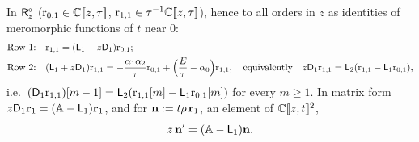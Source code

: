 \begin{prop}
\label{prop:lea-row2}
In $\mathsf{R}_{z}^{\circ}$ ($\mathrm{r}_{0,1}\in\mathbb{C}[\![ z,\tau ]\!]$, $\mathrm{r}_{1,1}\in\tau^{-1}\mathbb{C}[\![ z,\tau ]\!]$), hence to all orders in $z$ as identities of meromorphic functions of $t$ near $0$:
\begin{align*}
\text{Row 1:}\quad & \mathrm{r}_{1,1} = (\mathsf{L}_1 + z\mathsf{D}_1)\mathrm{r}_{0,1};\\
\text{Row 2:}\quad & (\mathsf{L}_1 + z\mathsf{D}_1)\mathrm{r}_{1,1} = -\frac{\alpha_1\alpha_2}{\tau}\mathrm{r}_{0,1} + \Bigl(\frac{E}{\tau}-\alpha_0\Bigr)\mathrm{r}_{1,1},\quad\text{equivalently}\quad z\mathsf{D}_1\mathrm{r}_{1,1} = \mathsf{L}_2(\mathrm{r}_{1,1} - \mathsf{L}_1\mathrm{r}_{0,1}),
\end{align*}
i.e.\ $(\mathsf{D}_1\mathrm{r}_{1,1})[m-1] = \mathsf{L}_2(\mathrm{r}_{1,1}[m] - \mathsf{L}_1\mathrm{r}_{0,1}[m])$ for every $m\geq 1$. In matrix form $z\mathsf{D}_1\mathbf{r}_1 = (\mathbb{A}-\mathsf{L}_1)\mathbf{r}_1$, and for $\mathbf{n} := t\rho\,\mathbf{r}_1$, an element of $\mathbb{C}[\![ z,t ]\!]^2$,
\begin{equation}
\label{eq:lea-qde}
z\,\mathbf{n}' = (\mathbb{A}-\mathsf{L}_1)\mathbf{n} .
\end{equation}
\end{prop}

